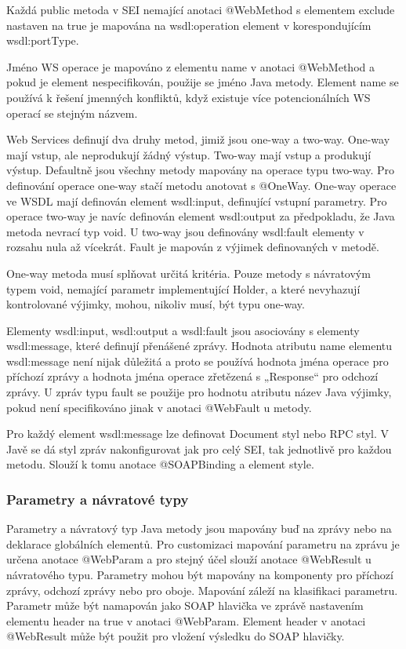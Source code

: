 \documentclass[11pt,twoside,a4paper]{book}
\begin{document}
Každá public metoda v SEI nemající anotaci @WebMethod s elementem exclude nastaven na
true je mapována na wsdl:operation element v korespondujícím wsdl:portType.

Jméno WS operace je mapováno z elementu name v anotaci @WebMethod a pokud je
element nespecifikován, použije se jméno Java metody. Element name se používá k řešení
jmenných konfliktů, když existuje více potencionálních WS operací se stejným názvem.

Web Services definují dva druhy metod, jimiž jsou one-way a two-way. One-way mají vstup,
ale neprodukují žádný výstup. Two-way mají vstup a produkují výstup. Defaultně jsou
všechny metody mapovány na operace typu two-way. Pro definování operace one-way stačí
metodu anotovat s @OneWay. One-way operace ve WSDL mají definován element
wsdl:input, definující vstupní parametry. Pro operace two-way je navíc definován element
wsdl:output za předpokladu, že Java metoda nevrací typ void. U two-way jsou definovány
wsdl:fault elementy v rozsahu nula až vícekrát. Fault je mapován z výjimek definovaných v
metodě.

One-way metoda musí splňovat určitá kritéria. Pouze metody s návratovým typem void,
nemající parametr implementující Holder, a které nevyhazují kontrolované výjimky, mohou,
nikoliv musí, být typu one-way.

Elementy wsdl:input, wsdl:output a wsdl:fault jsou asociovány s elementy wsdl:message,
které definují přenášené zprávy. Hodnota atributu name elementu wsdl:message není nijak
důležitá a proto se používá hodnota jména operace pro příchozí zprávy a hodnota jména
operace zřetězená s „Response“ pro odchozí zprávy. U zpráv typu fault se použije pro
hodnotu atributu název Java výjimky, pokud není specifikováno jinak v anotaci @WebFault u
metody.

Pro každý element wsdl:message lze definovat Document styl nebo RPC styl. V Javě se dá
styl zpráv nakonfigurovat jak pro celý SEI, tak jednotlivě pro každou metodu. Slouží k tomu
anotace @SOAPBinding a element style.

\subsubsection{Parametry a návratové typy}

Parametry a návratový typ Java metody jsou mapovány buď na zprávy nebo na deklarace
globálních elementů. Pro customizaci mapování parametru na zprávu je určena anotace
@WebParam a pro stejný účel slouží anotace @WebResult u návratového typu. Parametry
mohou být mapovány na komponenty pro příchozí zprávy, odchozí zprávy nebo pro oboje.
Mapování záleží na klasifikaci parametru. Parametr může být namapován jako SOAP
hlavička ve zprávě nastavením elementu header na true v anotaci @WebParam. Element
header v anotaci @WebResult může být použit pro vložení výsledku do SOAP hlavičky.
\end{document}
